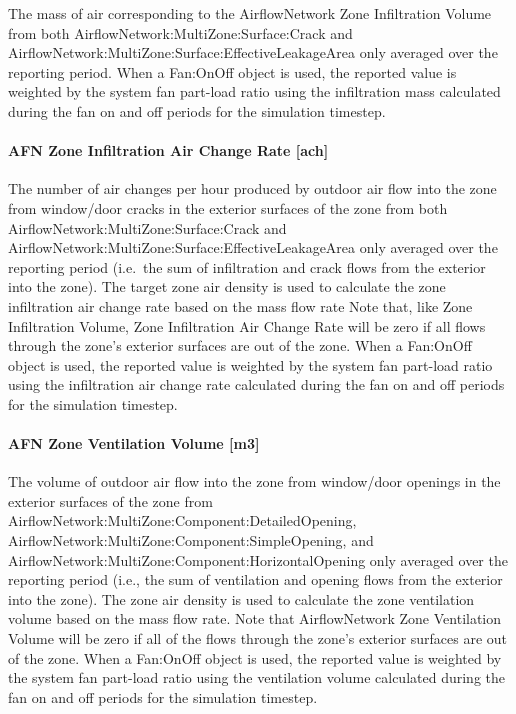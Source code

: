 The mass of air corresponding to the AirflowNetwork Zone Infiltration Volume from both AirflowNetwork:MultiZone:Surface:Crack and AirflowNetwork:MultiZone:Surface:EffectiveLeakageArea only averaged over the reporting period. When a Fan:OnOff object is used, the reported value is weighted by the system fan part-load ratio using the infiltration mass calculated during the fan on and off periods for the simulation timestep.

\paragraph{AFN Zone Infiltration Air Change Rate {[}ach{]}}\label{afn-zone-infiltration-air-change-rate-ach}

The number of air changes per hour produced by outdoor air flow into the zone from window/door cracks in the exterior surfaces of the zone from both AirflowNetwork:MultiZone:Surface:Crack and AirflowNetwork:MultiZone:Surface:EffectiveLeakageArea only averaged over the reporting period (i.e.~the sum of infiltration and crack flows from the exterior into the zone). The target zone air density is used to calculate the zone infiltration air change rate based on the mass flow rate Note that, like Zone Infiltration Volume, Zone Infiltration Air Change Rate will be zero if all flows through the zone's exterior surfaces are out of the zone. When a Fan:OnOff object is used, the reported value is weighted by the system fan part-load ratio using the infiltration air change rate calculated during the fan on and off periods for the simulation timestep.

\paragraph{AFN Zone Ventilation Volume {[}m3{]}}\label{afn-zone-ventilation-volume-m3}

The volume of outdoor air flow into the zone from window/door openings in the exterior surfaces of the zone from AirflowNetwork:MultiZone:Component:DetailedOpening, AirflowNetwork:MultiZone:Component:SimpleOpening, and AirflowNetwork:MultiZone:Component:HorizontalOpening only averaged over the reporting period (i.e., the sum of ventilation and opening flows from the exterior into the zone). The zone air density is used to calculate the zone ventilation volume based on the mass flow rate. Note that AirflowNetwork Zone Ventilation Volume will be zero if all of the flows through the zone's exterior surfaces are out of the zone. When a Fan:OnOff object is used, the reported value is weighted by the system fan part-load ratio using the ventilation volume calculated during the fan on and off periods for the simulation timestep.

